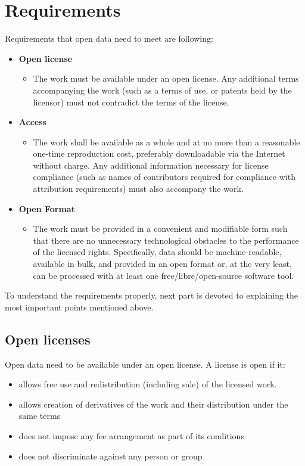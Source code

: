 \documentclass[thesis=B,english]{FITthesis}[2012/06/26]
\begin{document}
	\section{Requirements}
	Requirements that open data need to meet are following:\cite{opendefinition}
	\renewcommand\labelitemii{}
	\begin{itemize}
	 	\item \textbf{Open license}
			\begin{itemize}
				\item The work must be available under an open license. Any additional terms accompanying the work (such as a terms of use, or patents held by the licensor) must not contradict the terms of the license.
		\end{itemize}
  		\item \textbf{Access}
  			\begin{itemize}
  				\item The work shall be available as a whole and at no more than a reasonable one-time reproduction cost, preferably downloadable via the Internet without charge. Any additional information necessary for license compliance (such as names of contributors required for compliance with attribution requirements) must also accompany the work.
  			\end{itemize}
  			\item \textbf{Open Format}
  			\begin{itemize}
  				\item The work must be provided in a convenient and modifiable form such that there are no unnecessary technological obstacles to the performance of the licensed rights. Specifically, data should be machine-readable, available in bulk, and provided in an open format or, at the very least, can be processed with at least one free/libre/open-source software tool.
  			\end{itemize}
	\end{itemize}

To understand the requirements properly, next part is devoted to explaining the most important points mentioned above.
	\subsection{Open licenses}
	Open data need to be available under an open license. A license is open if it:
	\begin{itemize}
		\item allows free use and redistribution (including sale) of the licensed work.
		\item allows creation of derivatives of the work and their distribution under the same terms
		\item does not impose any fee arrangement as part of its conditions
		\item does not discriminate against any person or group
	\end{itemize} 
\end{document}
